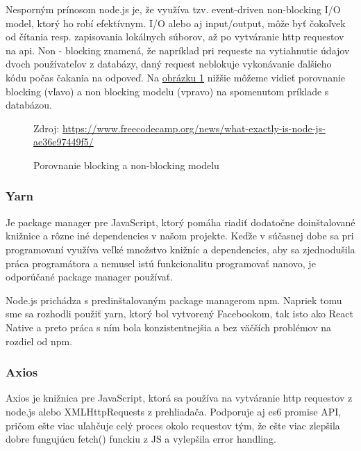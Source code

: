 Nesporným prínosom node.js je, že využíva tzv. event-driven non-blocking I/O model, ktorý ho robí efektívnym. I/O alebo aj input/output, môže byť čokoľvek od čítania resp. zapisovania lokálnych súborov, až po vytváranie \acrshort{http} requestov na \acrshort{api}. Non - blocking znamená, že napríklad pri requeste na vytiahnutie údajov dvoch používateľov z databázy, daný request neblokuje vykonávanie ďalšieho kódu počas čakania na odpoveď. Na \hyperref[nodejsImg]{ obrázku \ref{nodejsImg}} nižšie môžeme vidieť porovnanie blocking (vľavo) a non blocking modelu (vpravo) na spomenutom príklade s databázou. \\

\begin{figure}[!htbp]
  \centering  
  \def\stackalignment{c}
           {\scriptsize%
            Zdroj: \url{https://www.freecodecamp.org/news/what-exactly-is-node-js-ae36e97449f5/}}
	\caption{Porovnanie blocking a non-blocking modelu}  
  \label{nodejsImg}
\end{figure}

\subsubsection{Yarn}
Je package manager pre JavaScript, ktorý pomáha riadiť dodatočne doinštalované knižnice a rôzne iné dependencies v našom projekte. Keďže v súčasnej dobe sa pri programovaní využíva veľké množstvo knižníc a dependencies, aby sa zjednodušila práca programátora a nemusel istú funkcionalitu programovať nanovo, je odporúčané package manager používať. 

Node.js prichádza s predinštalovaným package managerom npm. Napriek tomu sme sa rozhodli použiť yarn, ktorý bol vytvorený Facebookom, tak isto ako React Native a preto práca s ním bola konzistentnejšia a bez väčších problémov na rozdiel od npm. \\

\subsubsection{Axios}
Axios je knižnica pre JavaScript, ktorá sa používa na vytváranie \acrshort{http} requestov z node.js alebo XMLHttpRequests z prehliadača. Podporuje aj \acrshort{es6} promise API, pričom ešte viac uľahčuje celý proces okolo requestov tým, že ešte viac zlepšila dobre fungujúcu fetch() funckiu z JS a vylepšila error handling. \\


